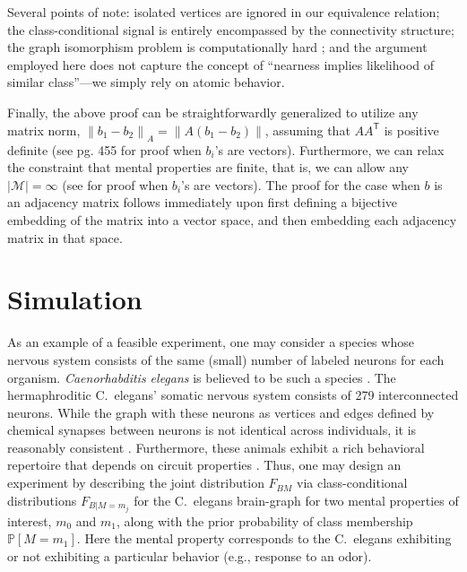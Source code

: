 \documentclass{article}
\newcommand{\mM}{\mathcal{M}}
\newcommand{\PP}{\mathbb{P}}           %
\providecommand{\norm}[1]{\left \lVert#1 \right  \rVert}
\newcommand{\T}{^{\ensuremath{\mathsf{T}}}}           %
\begin{document}
Several points of note:  isolated vertices are ignored in our equivalence relation; the class-conditional signal is entirely encompassed by the connectivity structure; the graph isomorphism problem is computationally hard \cite{ConroyLouis97,ZaslavskiyVert08}; and the argument employed here does not capture the concept of ``nearness implies likelihood of similar class''---we simply rely on atomic behavior.

Finally, the above proof can be straightforwardly generalized to utilize any matrix norm, $\norm{b_1-b_2}_A=\norm{A(b_1-b_2)}$, assuming that $A A\T$ is positive definite (see \cite{DGL96} pg. 455 for proof when $b_i$'s are vectors).  Furthermore, we can relax the constraint that mental properties are finite, that is, we can allow any $|\mM| = \infty$ (see \cite{Stone77} for proof when $b_i$'s are vectors).  The proof for the case when $b$ is an adjacency matrix follows immediately upon first defining a bijective embedding of the matrix into a vector space, and then embedding each adjacency matrix in that space.  

\section{Simulation} \label{simulation}

As an example of a feasible experiment, one may consider a species whose nervous system consists of the same (small) number of labeled neurons for each organism. {\it Caenorhabditis elegans} is believed to be such a species \cite{Durbin87}. The hermaphroditic C.~elegans' somatic nervous system consists of 279 interconnected neurons. While the graph with these neurons as vertices and edges defined by chemical synapses between neurons is not identical across individuals, it is reasonably consistent \cite{Durbin87}. Furthermore, these animals exhibit a rich behavioral repertoire that depends on circuit properties \cite{deBonoMaricq05}. Thus, one may design an experiment by describing the joint distribution $F_{BM}$ via class-conditional distributions $F_{B|M=m_j}$ for the C.~elegans brain-graph for two mental properties of interest, $m_0$ and $m_1$, along with the prior probability of class membership $\PP[M=m_1]$. Here the mental property corresponds to the C.~elegans exhibiting or not exhibiting a particular behavior (e.g., response to an odor).
\end{document}
